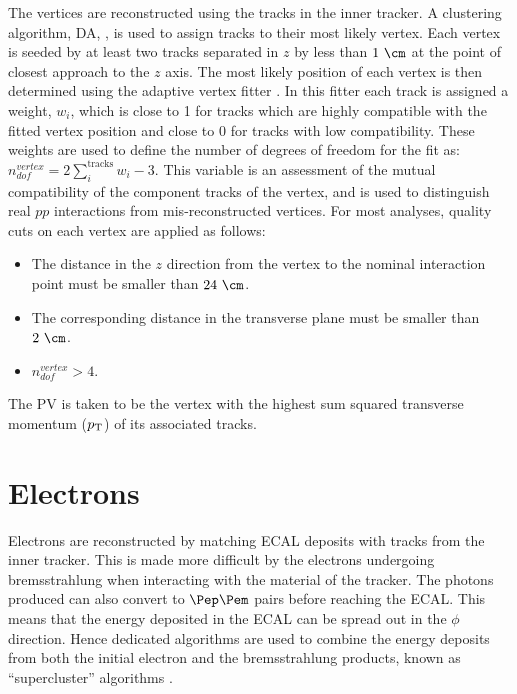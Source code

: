 The vertices are reconstructed using the tracks in the inner
tracker. A clustering algorithm, \ac{DA},
\cite{DetAnnealing}, is used to assign tracks to their most likely 
vertex. Each vertex is seeded by at least two tracks separated in $z$ by less than
$1~\cm$ at the point of closest approach to the $z$ axis.
The most likely position of each vertex is then determined using the
adaptive vertex fitter \cite{adaptivevertex}. In
this fitter each track is assigned a weight, $w_{i}$, which is close to 1 for tracks which
are highly compatible with the fitted vertex position and close to 0 for tracks with low
compatibility. These weights are used to define the number of degrees of freedom
for the fit as: $n_{dof}^{vertex} = 2\sum_{i}^{\text{tracks}}w_{i}-3$. This
variable is an assessment of the mutual compatibility of the component tracks of
the vertex, and is used to distinguish real $pp$ interactions from
mis-reconstructed vertices. For most analyses, quality cuts \cite{CMS-PAS-TRK-10-005} on each vertex are
applied as follows:
\begin{itemize}
\item The distance in the $z$ direction from the vertex to the nominal interaction
point must be smaller than $24~\cm$. 
\item The corresponding distance in the transverse plane must be smaller than
$2~\cm$.
\item $n_{dof}^{vertex} > 4$.
\end{itemize}

The \ac{PV} is taken to be the vertex with the highest sum squared transverse
momentum ($p_{\mathrm{T}}$) of its associated tracks. 

\section{Electrons}
\label{sec:electrons}

Electrons are reconstructed by matching \ac{ECAL} deposits with tracks from the
inner tracker. This is made more difficult by the electrons
undergoing bremsstrahlung when interacting with the material of the tracker.
The photons produced can also convert to $\Pep\Pem$ pairs before
reaching the \ac{ECAL}. This means that the energy deposited in the \ac{ECAL} 
can be spread out in the $\phi$ direction. Hence dedicated algorithms are used
to combine the energy deposits from both the initial electron and the
bremsstrahlung products, known as ``supercluster'' algorithms \cite{ElectronReco}.

